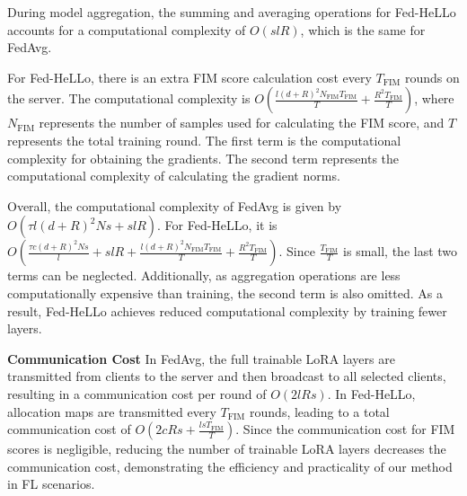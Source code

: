 \documentclass[lettersize,journal]{IEEEtran}
\begin{document}
{During model aggregation, the summing and averaging operations for Fed-HeLLo accounts for a computational complexity of $O(s l R)$, which is the same for FedAvg.}

{For Fed-HeLLo, there is an extra FIM score calculation cost every $T_{\text{FIM}}$ rounds on the server. The computational complexity is $O(\frac{l (d+R)^2 N_{\text{FIM}}T_{\text{FIM}}}{T} + \frac{R^2T_{\text{FIM}}}{T})$, where $N_{\text{FIM}}$ represents the number of samples used for calculating the FIM score, and $T$ represents the total training round. The first term is the computational complexity for obtaining the gradients. The second term represents the computational complexity of calculating the gradient norms.}

{Overall, the computational complexity of FedAvg is given by $O(\tau l (d+R)^2 N s + s l R)$. For Fed-HeLLo, it is $O(\frac{\tau c (d+R)^2 N s}{l} + s l R + \frac{l (d+R)^2 N_{\text{FIM}}T_{\text{FIM}}}{T} + \frac{R^2T_{\text{FIM}}}{T})$. Since $\frac{T_{\text{FIM}}}{T}$ is small, the last two terms can be neglected. Additionally, as aggregation operations are less computationally expensive than training, the second term is also omitted. As a result, Fed-HeLLo achieves reduced computational complexity by training fewer layers.}

{\textbf{Communication Cost}}
%
%
{In FedAvg, the full trainable LoRA layers are transmitted from clients to the server and then broadcast to all selected clients, resulting in a communication cost per round of $O(2 l R s)$. In Fed-HeLLo, allocation maps are transmitted every $T_{\text{FIM}}$ rounds, leading to a total communication cost of $O(2 c R s + \frac{l s T_{\text{FIM}}}{T})$. Since the communication cost for FIM scores is negligible, reducing the number of trainable LoRA layers decreases the communication cost, demonstrating the efficiency and practicality of our method in FL scenarios.}
\end{document}
